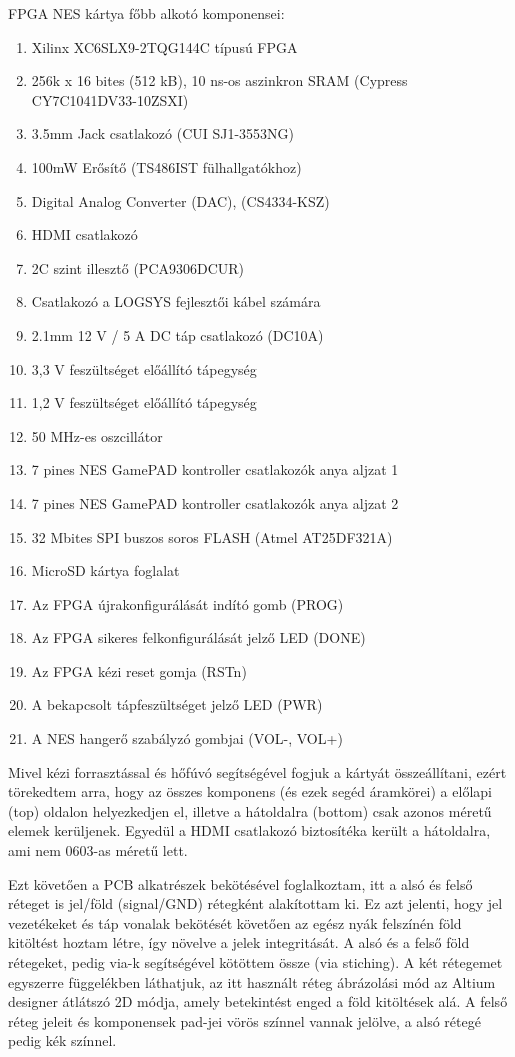 	FPGA NES kártya főbb alkotó komponensei:
	\begin{enumerate}
		\item Xilinx XC6SLX9-2TQG144C típusú FPGA
		\item 256k x 16 bites (512 kB), 10 ns-os aszinkron SRAM (Cypress CY7C1041DV33-10ZSXI)
		\item 3.5mm Jack csatlakozó (CUI SJ1-3553NG)
		\item 100mW Erősítő (TS486IST fülhallgatókhoz)
		\item Digital Analog Converter (DAC), (CS4334-KSZ)
		\item HDMI csatlakozó
		\item 2C szint illesztő (PCA9306DCUR)
		\item Csatlakozó a LOGSYS fejlesztői kábel számára
		\item 2.1mm 12 V / 5 A DC táp csatlakozó (DC10A)
		\item 3,3 V feszültséget előállító tápegység
		\item 1,2 V feszültséget előállító tápegység
		\item 50 MHz-es oszcillátor 
		\item 7 pines NES GamePAD kontroller csatlakozók anya aljzat 1
		\item 7 pines NES GamePAD kontroller csatlakozók anya aljzat 2
		\item 32 Mbites SPI buszos soros FLASH (Atmel AT25DF321A)
		\item MicroSD kártya foglalat
		\item Az FPGA újrakonfigurálását indító gomb (PROG)
		\item Az FPGA sikeres felkonfigurálását jelző LED (DONE)
		\item Az FPGA kézi reset gomja (RSTn)
		\item A bekapcsolt tápfeszültséget jelző LED (PWR)
		\item A NES hangerő szabályzó gombjai (VOL-, VOL+)
	\end{enumerate}
	
	Mivel kézi forrasztással és hőfúvó segítségével fogjuk a kártyát összeállítani, ezért törekedtem arra, hogy az összes komponens (és ezek segéd áramkörei) a előlapi (top) oldalon helyezkedjen el, illetve a hátoldalra (bottom) csak azonos méretű elemek kerüljenek. Egyedül a HDMI csatlakozó biztosítéka került a hátoldalra, ami nem 0603-as méretű lett.
	
	Ezt követően a PCB alkatrészek bekötésével foglalkoztam, itt a alsó és felső réteget is jel/föld (signal/GND) rétegként alakítottam ki. Ez azt jelenti, hogy jel vezetékeket és táp vonalak bekötését követően az egész nyák felszínén föld kitöltést hoztam létre, így növelve a jelek integritását. A alsó és a felső föld rétegeket, pedig via-k segítségével kötöttem össze (via stiching). A két rétegemet egyszerre  függelékben láthatjuk, az itt használt réteg ábrázolási mód az Altium designer átlátszó 2D módja, amely betekintést enged a föld kitöltések alá. A felső réteg jeleit és komponensek pad-jei vörös színnel vannak jelölve, a alsó rétegé pedig kék színnel.
	
